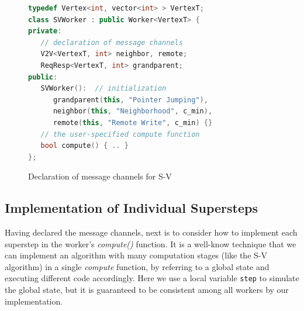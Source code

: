 \documentclass{sokendai_thesis} %
\begin{document}
\begin{figure}[ht]
\centering
\vspace{-2ex}
\begin{lstlisting}[basicstyle=\small\ttfamily,numbers=none,language=c++,
xleftmargin=0.1\textwidth]
typedef Vertex<int, vector<int> > VertexT;
class SVWorker : public Worker<VertexT> {
private:
   // declaration of message channels
   V2V<VertexT, int> neighbor, remote;
   ReqResp<VertexT, int> grandparent;
public:
   SVWorker():  // initialization
      grandparent(this, "Pointer Jumping"),
      neighbor(this, "Neighborhood", c_min),
      remote(this, "Remote Write", c_min) {}
   // the user-specified compute function
   bool compute() { .. }
};
\end{lstlisting}
\vspace{-2ex}
\caption{Declaration of message channels for S-V}
\label{fig:sv-declaration}
\end{figure}


\subsection{Implementation of Individual Supersteps}
\label{sec:sv-impl}

Having declared the message channels, next is to consider how to implement each superstep in the worker's \emph{compute()} function.
It is a well-know technique that we can implement an algorithm with many computation stages (like the S-V algorithm) in a single \emph{compute} function, by referring to a global state and executing different code accordingly.
Here we use a local variable \texttt{step} to simulate the global state, but it is guaranteed to be consistent among all workers by our implementation.
\end{document}
